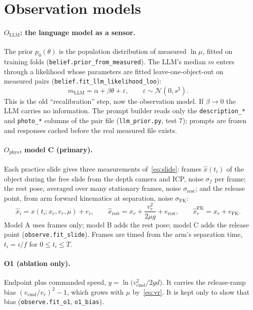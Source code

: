\documentclass[10pt]{article}
\newcommand{\code}[1]{\texttt{#1}}
\begin{document}
\section{Observation models}
\label{sec:observation}
\paragraph{$O_{\text{LLM}}$: the language model as a sensor.}  The prior $p_0(\theta)$ is the population
distribution of measured $\ln\mu$, fitted on training folds (\code{belief.prior\_from\_measured}).  The LLM's
median $m$ enters through a likelihood whose parameters are fitted leave-one-object-out on measured pairs
(\code{belief.fit\_llm\_likelihood\_loo}):
\begin{equation}
m_{\text{LLM}}=\alpha+\beta\theta+\varepsilon,\qquad\varepsilon\sim\mathcal N(0,s^{2}).
\end{equation}
This is the old ``recalibration'' step, now the observation model.  If $\beta\to0$ the LLM carries no
information.  The prompt builder reads only the \code{description\_*} and \code{photo\_*} columns of the pair file
(\code{llm\_prior.py}, test 7); prompts are frozen and responses cached before the real measured file exists.

\paragraph{$O_{\text{phys}}$, model C (primary).}  Each practice slide gives three measurements of~\eqref{eq:slide}:
frames $\hat x(t_i)$ of the object during the free slide from the depth camera and ICP, noise $\sigma_f$ per frame;
the rest pose, averaged over many stationary frames, noise $\sigma_{\text{rest}}$; and the release point, from arm
forward kinematics at separation, noise $\sigma_{\text{FK}}$:
\begin{equation}
\hat x_i=x(t_i;x_r,v_r,\mu)+e_i,\qquad
\hat x_{\text{rest}}=x_r+\frac{v_r^{2}}{2\mu g}+e_{\text{rest}},\qquad
\hat x_r^{\text{FK}}=x_r+e_{\text{FK}} .
\end{equation}
Model A uses frames only; model B adds the rest pose; model C adds the release point
(\code{observe.fit\_slide}).  Frames are timed from the arm's separation time, $t_i=i/f$ for $0\le t_i\le T$.

\paragraph{O1 (ablation only).}  Endpoint plus commanded speed, $y=\ln\big(v_{\text{cmd}}^2/2gd\big)$.  It carries the
release-ramp bias $(v_{\text{cmd}}/v_r)^2-1$, which grows with $\mu$ by~\eqref{eq:vr}.  It is kept only to show that
bias (\code{observe.fit\_o1}, \code{o1\_bias}).
\end{document}
